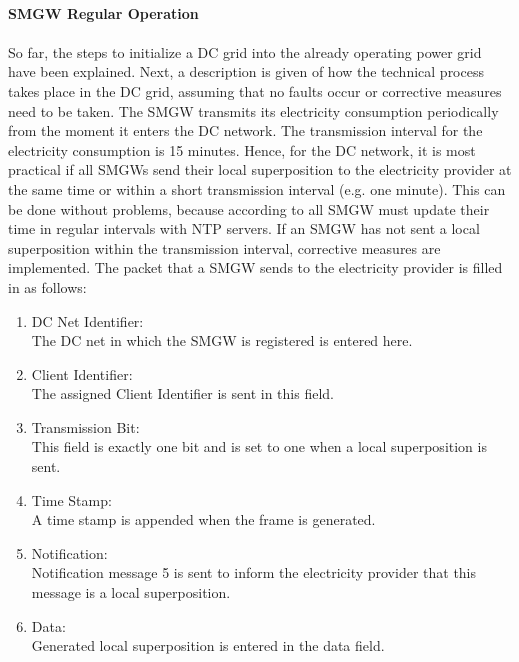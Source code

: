\\
\textbf{SMGW Regular Operation}
\\
\\
So far, the steps to initialize a DC grid into the already operating power grid have been explained. Next, a description is given of how the technical process takes place in the DC grid, assuming that no faults occur or corrective measures need to be taken. The \gls{SMGW} transmits its electricity consumption periodically from the moment it enters the DC network. The transmission interval for the electricity consumption is 15 minutes. Hence, for the DC network, it is most practical if all \gls{SMGW}s send their local superposition to the electricity provider at the same time or within a short transmission interval (e.g. one minute). This can be done without problems, because according to \cite{TR-031} all \gls{SMGW} must update their time in regular intervals with NTP servers. If an \gls{SMGW} has not sent a local superposition within the transmission interval, corrective measures are implemented. The packet that a \gls{SMGW} sends to the electricity provider is filled in as follows:
\begin{enumerate}
\item DC Net Identifier:\\
The DC net in which the \gls{SMGW} is registered is entered here.
\item Client Identifier:\\ 
The assigned Client Identifier is sent in this field.
\item Transmission Bit:\\
This field is exactly one bit and is set to one when a local superposition is sent.
\item Time Stamp:\\
A time stamp is appended when the frame is generated.
\item Notification:\\
Notification message 5 is sent to inform the electricity provider that this message is a local superposition.
\item Data:\\
Generated local superposition is entered in the data field.
\end{enumerate}
